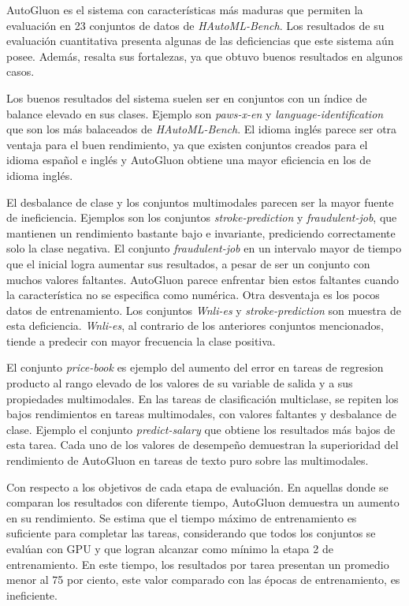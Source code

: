 AutoGluon es el sistema con características más maduras que permiten la evaluación en 23 conjuntos de datos de \textit{HAutoML-Bench}.
Los resultados de su evaluación cuantitativa presenta algunas de las deficiencias que este sistema aún posee. Además, resalta sus fortalezas, ya que obtuvo buenos resultados 
en algunos casos.

Los buenos resultados del sistema suelen ser en conjuntos con un índice de balance elevado en sus clases. Ejemplo son \textit{paws-x-en} y 
\textit{language-identification} que son los más balaceados de \textit{HAutoML-Bench}. El idioma inglés parece ser otra ventaja para el buen rendimiento, ya que
existen conjuntos creados para el idioma español e inglés y AutoGluon obtiene una mayor eficiencia en los de idioma inglés.

El desbalance de clase y los conjuntos multimodales parecen ser la mayor fuente de ineficiencia. Ejemplos son los conjuntos \textit{stroke-prediction} y 
\textit{fraudulent-job}, que mantienen un rendimiento bastante bajo e invariante, prediciendo correctamente solo la clase negativa. El conjunto \textit{fraudulent-job} 
en un intervalo mayor de tiempo que el inicial logra aumentar sus resultados, a pesar de ser un conjunto con muchos valores faltantes. AutoGluon parece 
enfrentar bien estos faltantes cuando la característica no se especifica como numérica. Otra desventaja es los 
pocos datos de entrenamiento. Los conjuntos \textit{Wnli-es} y \textit{stroke-prediction} son muestra de esta deficiencia. \textit{Wnli-es}, al 
contrario de los anteriores conjuntos mencionados, tiende a predecir con mayor frecuencia la clase positiva.

El conjunto \textit{price-book} es ejemplo del aumento del error en tareas de regresion producto al rango elevado de los valores de su variable de salida y a sus 
propiedades multimodales. En las tareas de clasificación multiclase, se repiten los bajos rendimientos
en tareas multimodales, con valores faltantes y desbalance de clase. Ejemplo el conjunto \textit{predict-salary} que obtiene los resultados más bajos de esta tarea. 
Cada uno de los valores de desempeño demuestran la superioridad del rendimiento de AutoGluon en tareas de texto puro sobre las multimodales. 

Con respecto a los objetivos de cada etapa de evaluación. En aquellas donde se comparan los resultados con diferente tiempo, AutoGluon demuestra un aumento en 
su rendimiento. Se estima que el tiempo máximo de entrenamiento es suficiente para completar las tareas, considerando que todos los conjuntos se evalúan con GPU y que 
logran alcanzar como mínimo la etapa 2 de entrenamiento. En este tiempo, los resultados por tarea presentan un promedio menor al 75 por ciento, este valor comparado 
con las épocas de entrenamiento, es ineficiente. 

